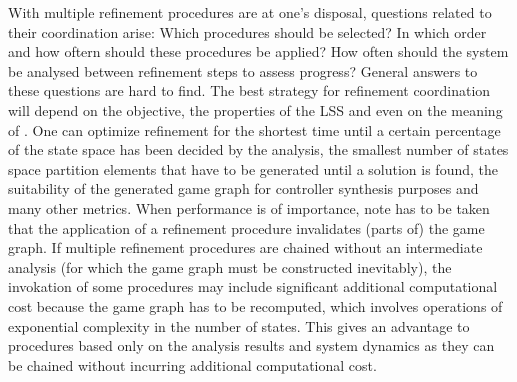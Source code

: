 With multiple refinement procedures are at one's disposal, questions related to their coordination arise:
Which procedures should be selected?
In which order and how oftern should these procedures be applied?
How often should the system be analysed between refinement steps to assess progress?
General answers to these questions are hard to find.
The best strategy for refinement coordination will depend on the objective, the properties of the LSS and even on the meaning of .
One can optimize refinement for the shortest time until a certain percentage of the state space has been decided by the analysis, the smallest number of states space partition elements that have to be generated until a solution is found, the suitability of the generated game graph for controller synthesis purposes and many other metrics.
When performance is of importance, note has to be taken that the application of a refinement procedure invalidates (parts of) the game graph.
If multiple refinement procedures are chained without an intermediate analysis (for which the game graph must be constructed inevitably), the invokation of some procedures may include significant additional computational cost because the game graph has to be recomputed, which involves operations of exponential complexity in the number of states.
This gives an advantage to procedures based only on the analysis results and system dynamics as they can be chained without incurring additional computational cost.


